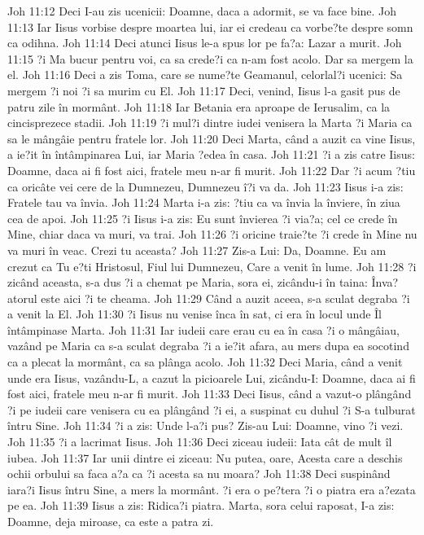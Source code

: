 Joh 11:12  Deci I-au zis ucenicii: Doamne, daca a adormit, se va face bine.
Joh 11:13  Iar Iisus vorbise despre moartea lui, iar ei credeau ca vorbe?te despre somn ca odihna.
Joh 11:14  Deci atunci Iisus le-a spus lor pe fa?a: Lazar a murit.
Joh 11:15  ?i Ma bucur pentru voi, ca sa crede?i ca n-am fost acolo. Dar sa mergem la el.
Joh 11:16  Deci a zis Toma, care se nume?te Geamanul, celorlal?i ucenici: Sa mergem ?i noi ?i sa murim cu El.
Joh 11:17  Deci, venind, Iisus l-a gasit pus de patru zile în mormânt.
Joh 11:18  Iar Betania era aproape de Ierusalim, ca la cincisprezece stadii.
Joh 11:19  ?i mul?i dintre iudei venisera la Marta ?i Maria ca sa le mângâie pentru fratele lor.
Joh 11:20  Deci Marta, când a auzit ca vine Iisus, a ie?it în întâmpinarea Lui, iar Maria ?edea în casa.
Joh 11:21  ?i a zis catre Iisus: Doamne, daca ai fi fost aici, fratele meu n-ar fi murit.
Joh 11:22  Dar ?i acum ?tiu ca oricâte vei cere de la Dumnezeu, Dumnezeu î?i va da.
Joh 11:23  Iisus i-a zis: Fratele tau va învia.
Joh 11:24  Marta i-a zis: ?tiu ca va învia la înviere, în ziua cea de apoi.
Joh 11:25  ?i Iisus i-a zis: Eu sunt învierea ?i via?a; cel ce crede în Mine, chiar daca va muri, va trai.
Joh 11:26  ?i oricine traie?te ?i crede în Mine nu va muri în veac. Crezi tu aceasta?
Joh 11:27  Zis-a Lui: Da, Doamne. Eu am crezut ca Tu e?ti Hristosul, Fiul lui Dumnezeu, Care a venit în lume.
Joh 11:28  ?i zicând aceasta, s-a dus ?i a chemat pe Maria, sora ei, zicându-i în taina: Înva?atorul este aici ?i te cheama.
Joh 11:29  Când a auzit aceea, s-a sculat degraba ?i a venit la El.
Joh 11:30  ?i Iisus nu venise înca în sat, ci era în locul unde Îl întâmpinase Marta.
Joh 11:31  Iar iudeii care erau cu ea în casa ?i o mângâiau, vazând pe Maria ca s-a sculat degraba ?i a ie?it afara, au mers dupa ea socotind ca a plecat la mormânt, ca sa plânga acolo.
Joh 11:32  Deci Maria, când a venit unde era Iisus, vazându-L, a cazut la picioarele Lui, zicându-I: Doamne, daca ai fi fost aici, fratele meu n-ar fi murit.
Joh 11:33  Deci Iisus, când a vazut-o plângând ?i pe iudeii care venisera cu ea plângând ?i ei, a suspinat cu duhul ?i S-a tulburat întru Sine.
Joh 11:34  ?i a zis: Unde l-a?i pus? Zis-au Lui: Doamne, vino ?i vezi.
Joh 11:35  ?i a lacrimat Iisus.
Joh 11:36  Deci ziceau iudeii: Iata cât de mult îl iubea.
Joh 11:37  Iar unii dintre ei ziceau: Nu putea, oare, Acesta care a deschis ochii orbului sa faca a?a ca ?i acesta sa nu moara?
Joh 11:38  Deci suspinând iara?i Iisus întru Sine, a mers la mormânt. ?i era o pe?tera ?i o piatra era a?ezata pe ea.
Joh 11:39  Iisus a zis: Ridica?i piatra. Marta, sora celui raposat, I-a zis: Doamne, deja miroase, ca este a patra zi.
